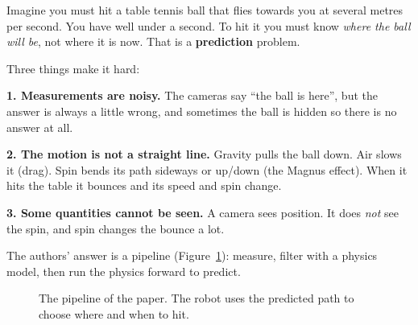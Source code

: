 \documentclass[11pt,a4paper]{article}
\begin{document}
Imagine you must hit a table tennis ball that flies towards you at several metres per second.
You have well under a second. To hit it you must know \emph{where the ball will be}, not where
it is now. That is a \textbf{prediction} problem.

Three things make it hard:

\textbf{1. Measurements are noisy.} The cameras say ``the ball is here'', but the answer is
always a little wrong, and sometimes the ball is hidden so there is no answer at all.

\textbf{2. The motion is not a straight line.} Gravity pulls the ball down. Air slows it
(drag). Spin bends its path sideways or up/down (the Magnus effect). When it hits the table it
bounces and its speed and spin change.

\textbf{3. Some quantities cannot be seen.} A camera sees position. It does \emph{not} see
the spin, and spin changes the bounce a lot.

The authors' answer is a pipeline (Figure~\ref{fig:pipeline}): measure, filter with a physics
model, then run the physics forward to predict.

\begin{figure}[htbp]
\centering
{}
\caption{The pipeline of the paper. The robot uses the predicted path to choose where and when to hit.}
\label{fig:pipeline}
\end{figure}
\end{document}

